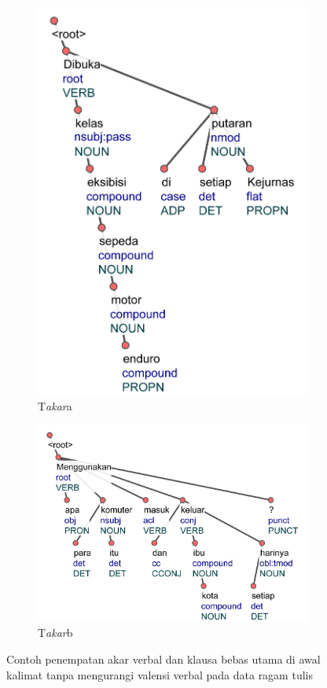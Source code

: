 \begin{figure}
\begin{subfigure}{.42\linewidth}
  \centering
  \includegraphics[width=1\linewidth] {pics/ts770.jpg} 
	\caption{T\textit{akar}a}
	\label{fig:ts770} 
\end{subfigure}
%
\begin{subfigure}{.57\linewidth}
  \centering
  \includegraphics[width=1\linewidth]{pics/ts7458.jpg} 
	\caption{T\textit{akar}b}
	\label{fig:ts7458} 
\end{subfigure}
\caption{Contoh penempatan akar verbal dan klausa bebas utama di awal kalimat tanpa mengurangi valensi verbal pada data ragam tulis}
\label{fig:rootnovalensi}
\end{figure}

